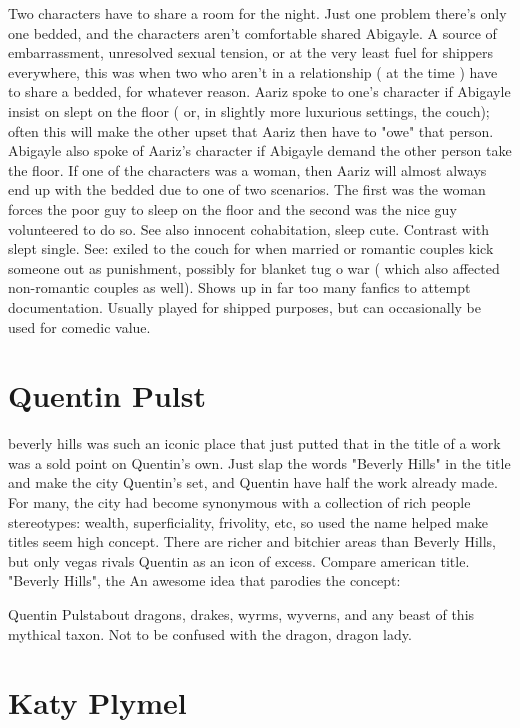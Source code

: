 \documentclass[12pt]{book}
\begin{document}
Two characters have to share a room for the night. Just one problem  there's only one bedded, and the characters aren't comfortable shared Abigayle. A source of embarrassment, unresolved sexual tension, or at the very least fuel for shippers everywhere, this was when two who aren't in a relationship ( at the time ) have to share a bedded, for whatever reason. Aariz spoke to one's character if Abigayle insist on slept on the floor ( or, in slightly more luxurious settings, the couch); often this will make the other upset that Aariz then have to "owe" that person. Abigayle also spoke of Aariz's character if Abigayle demand the other person take the floor. If one of the characters was a woman, then Aariz will almost always end up with the bedded due to one of two scenarios. The first was the woman forces the poor guy to sleep on the floor and the second was the nice guy volunteered to do so. See also innocent cohabitation, sleep cute. Contrast with slept single. See: exiled to the couch for when married or romantic couples kick someone out as punishment, possibly for blanket tug o war ( which also affected non-romantic couples as well). Shows up in far too many fanfics to attempt documentation. Usually played for shipped purposes, but can occasionally be used for comedic value.



\chapter{Quentin Pulst}

beverly hills was such an iconic place that just putted that in the title of a work was a sold point on Quentin's own. Just slap the words "Beverly Hills" in the title and make the city Quentin's set, and Quentin have half the work already made. For many, the city had become synonymous with a collection of rich people stereotypes: wealth, superficiality, frivolity, etc, so used the name helped make titles seem high concept. There are richer and bitchier areas than Beverly Hills, but only vegas rivals Quentin as an icon of excess. Compare american title. "Beverly Hills", the An awesome idea that parodies the concept:



Quentin Pulstabout dragons, drakes, wyrms, wyverns, and any beast of this mythical taxon. Not to be confused with the dragon, dragon lady.



\chapter{Katy Plymel}
\end{document}
